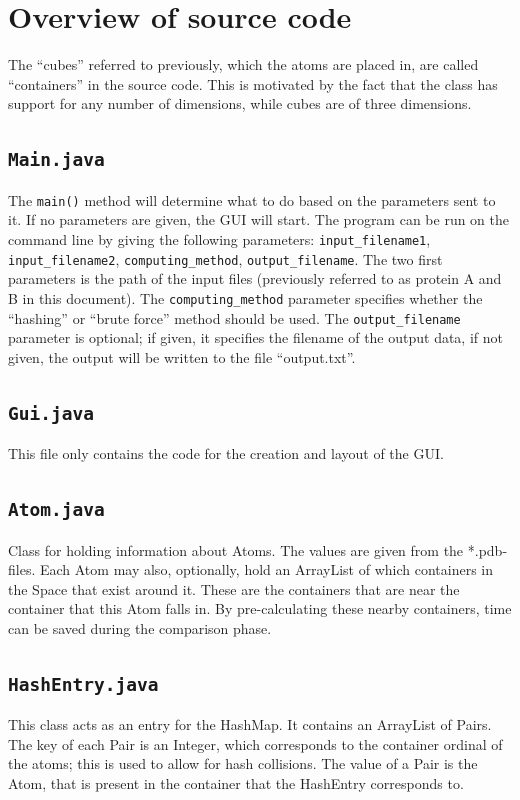\documentclass[a4paper]{article}
\begin{document}
\section*{Overview of source code}
The ``cubes'' referred to previously, which the atoms are placed in, are called ``containers'' in the source code. This is motivated by the fact that the class has support for any number of dimensions, while cubes are of three dimensions.

\subsection*{\texttt{Main.java}}
The \texttt{main()} method will determine what to do based on the parameters sent to it. If no parameters are given, the GUI will start. The program can be run on the command line by giving the following parameters: \texttt{input\_filename1}, \texttt{input\_filename2}, \texttt{computing\_method}, \texttt{output\_filename}. The two first parameters is the path of the input files (previously referred to as protein A and B in this document). The \texttt{computing\_method} parameter specifies whether the ``hashing'' or ``brute force'' method should be used. The \texttt{output\_filename} parameter is optional; if given, it specifies the filename of the output data, if not given, the output will be written to the file ``output.txt''.

\subsection*{\texttt{Gui.java}}
This file only contains the code for the creation and layout of the GUI.

\subsection*{\texttt{Atom.java}}
Class for holding information about Atoms. The values are given from the *.pdb-files. Each Atom may also, optionally, hold an ArrayList of which containers in the Space that exist around it. These are the containers that are near the container that this Atom falls in. By pre-calculating these nearby containers, time can be saved during the comparison phase.

\subsection*{\texttt{HashEntry.java}}
This class acts as an entry for the HashMap. It contains an ArrayList of Pairs. The key of each Pair is an Integer, which corresponds to the container ordinal of the atoms; this is used to allow for hash collisions. The value of a Pair is the Atom, that is present in the container that the HashEntry corresponds to.
\end{document}
